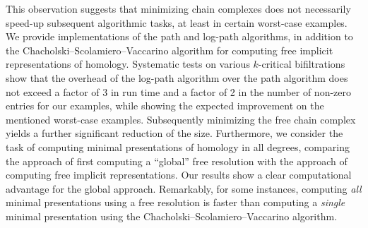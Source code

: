 \documentclass[11pt]{article}
\begin{document}
This observation suggests that minimizing chain complexes does not necessarily speed-up subsequent algorithmic tasks, at least in certain worst-case examples.
%
%
%
We provide implementations of the path and log-path algorithms, in addition to the Chacholski--Scolamiero--Vaccarino algorithm for computing free implicit representations of homology.
Systematic tests on various $k$-critical bifiltrations show that the overhead of the log-path algorithm over the path algorithm does not exceed a factor of 3 in run time and a factor of 2 in the number of non-zero entries for our examples, while showing the expected improvement on the mentioned worst-case examples. 
Subsequently minimizing the free chain complex yields a further significant reduction of the size.
Furthermore, we consider the task of computing minimal presentations of homology in all degrees, comparing the approach of first computing a ``global'' free resolution with the approach of computing free implicit representations.
Our results show a clear computational advantage for the global approach.
Remarkably, for some instances, computing \emph{all} minimal
presentations using a free resolution is faster than computing a \emph{single} minimal presentation using the Chacholski--Scolamiero--Vaccarino algorithm.
%
%
\end{document}
